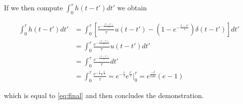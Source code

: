 If we then compute $\int_{0}^{\tau} h(t - t')dt'$ we obtain

\begin{align}
    \int_{0}^{\tau} h(t-t')dt' &= \int_{0}^{\tau} \left[ \frac{e^{-\frac{(t-t')}{\tau}}}{\tau} u(t-t') - \left(1-e^{-\frac{t-t'}{\tau}}\right)\delta(t-t') \right] dt'\\
    &= \int_{0}^{\tau} \frac{e^{-\frac{(t-t')}{\tau}}}{\tau} u(t-t')dt' \\
    &= \int_{0}^{\tau} \frac{e^{-\frac{(t-t')}{\tau}}}{\tau} dt'\\
    &= \int_{0}^{\tau} \frac{e^{-\frac{t}{\tau}}e^{\frac{t'}{\tau}}}{\tau} = e^{-\frac{t}{\tau}}e^{\frac{t'}{\tau}}\Big|_{0}^{\tau} = e^{\frac{-t}{tau}}(e-1)
\end{align}

which is equal to \ref{eq:final} and then concludes the demonstration.